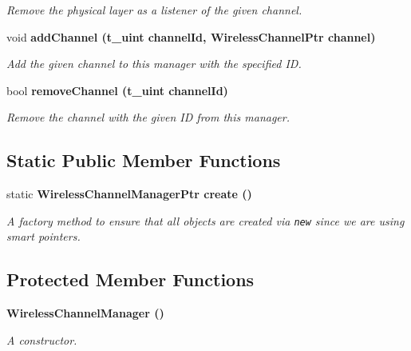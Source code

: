 \begin{CompactItemize}
\begin{CompactList}\small\item\em Remove the physical layer as a listener of the given channel. \item\end{CompactList}\item 
void \bf{add\-Channel} (\bf{t\_\-uint} channel\-Id, Wireless\-Channel\-Ptr channel)
\begin{CompactList}\small\item\em Add the given channel to this manager with the specified ID. \item\end{CompactList}\item 
bool \bf{remove\-Channel} (\bf{t\_\-uint} channel\-Id)
\begin{CompactList}\small\item\em Remove the channel with the given ID from this manager. \item\end{CompactList}\end{CompactItemize}
\subsection*{Static Public Member Functions}
\begin{CompactItemize}
\item 
static \bf{Wireless\-Channel\-Manager\-Ptr} \bf{create} ()\label{classWirelessChannelManager_1cd120bf30a3cd8fa885bdc8857bc2cc}

\begin{CompactList}\small\item\em A factory method to ensure that all objects are created via {\tt new} since we are using smart pointers. \item\end{CompactList}\end{CompactItemize}
\subsection*{Protected Member Functions}
\begin{CompactItemize}
\item 
\bf{Wireless\-Channel\-Manager} ()\label{classWirelessChannelManager_c70e105a3fde80ca22297f9211ce7028}

\begin{CompactList}\small\item\em A constructor. \item\end{CompactList}\end{CompactItemize}


